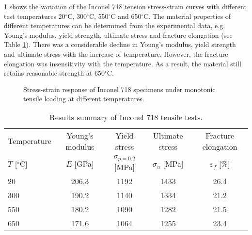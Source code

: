 \ref{Fig:IN718_Monotonic_Tension} shows the variation of the Inconel 718 tension stress-strain curves with different test temperatures 20$^{\circ}$C, 300$^{\circ}$C, 550$^{\circ}$C and 650$^{\circ}$C.
The material properties of different temperatures can be determined from the experimental data, e.g. Young's modulus, yield strength, ultimate stress and fracture elongation (see Table \ref{tab:General_material_mechanical_properties}).
There was a considerable decline in Young's modulus, yield strength and ultimate stress with the increase of temperature.
However, the fracture elongation was insensitivity with the temperature.
As a result, the material still retains reasonable strength at 650$^{\circ}$C.

\begin{figure}[!htp]
\centering{}
\caption{Stress-strain response of Inconel 718 specimens under monotonic tensile loading at different temperatures.}
\label{Fig:IN718_Monotonic_Tension}
\end{figure}

\begin{table}[htbp]
  \centering
  \caption{Results summary of Inconel 718 tensile tests.}
    \begin{tabular}{lcccc}
    \toprule
    Temperature         & Young's modulus   & Yield stress            & Ultimate stress     & Fracture elongation\\
    $T$ [$^{\circ}$C]   & $E$ [GPa]         & $\sigma_{p=0.2}$ [MPa]  & $\sigma_u$ [MPa]    & $\varepsilon_f$ [\%]\\
    \midrule
    20    & 206.3 & 1192 & 1433 & 26.4 \\
    300   & 190.2 & 1140 & 1334 & 21.2 \\
    550   & 180.2 & 1090 & 1282 & 21.5 \\
    650   & 171.6 & 1064 & 1255 & 23.4 \\
    \bottomrule
    \end{tabular}%
  \label{tab:General_material_mechanical_properties}%
\end{table}%

